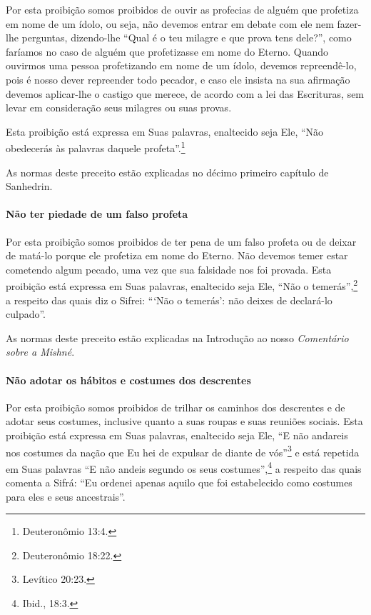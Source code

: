 Por esta proibição somos proibidos de ouvir as profecias de alguém que
profetiza em nome de um ídolo, ou seja, não devemos entrar em debate com
ele nem fazer-lhe perguntas, dizendo-lhe ``Qual é o teu milagre e que
prova tens dele?'', como faríamos no caso de alguém que profetizasse em
nome do Eterno. Quando ouvirmos uma pessoa profetizando em nome de um
ídolo, devemos repreendê-lo, pois é nosso dever repreender todo pecador,
e caso ele insista na sua afirmação devemos aplicar-lhe o castigo que
merece, de acordo com a lei das Escrituras, sem levar em consideração
seus milagres ou suas provas.

Esta proibição está expressa em Suas palavras, enaltecido seja Ele,
``Não obedecerás às palavras daquele profeta''.\footnote{Deuteronômio 13:4.}

As normas deste preceito estão explicadas no décimo primeiro capítulo
de Sanhedrin.

\paragraph{Não ter piedade de um falso profeta}

Por esta proibição somos proibidos de ter pena de um falso profeta ou de
deixar de matá-lo porque ele profetiza em nome do Eterno. Não devemos
temer estar cometendo algum pecado, uma vez que sua falsidade nos foi
provada. Esta proibição está expressa em Suas palavras, enaltecido seja
Ele, ``Não o temerás'',\footnote{Deuteronômio 18:22.} a respeito das quais diz o
Sifrei: ```Não o temerás': não deixes de declará-lo culpado''.

As normas deste preceito estão explicadas na Introdução ao nosso
\emph{Comentário sobre a Mishné}.

\paragraph{Não adotar os hábitos e costumes dos descrentes}

Por esta proibição somos proibidos de trilhar os caminhos dos descrentes
e de adotar seus costumes, inclusive quanto a suas roupas e suas
reuniões sociais. Esta proibição está expressa em Suas palavras,
enaltecido seja Ele, ``E não andareis nos costumes da nação que Eu hei
de expulsar de diante de vós''\footnote{Levítico 20:23.} e está repetida em Suas
palavras ``E não andeis segundo os seus costumes'',\footnote{Ibid., 18:3.} a
respeito das quais comenta a Sifrá: ``Eu ordenei apenas aquilo que foi
estabelecido como costumes para eles e seus ancestrais''.

